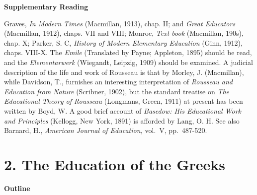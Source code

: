 \documentclass[]{book}
\begin{document}
\textbf{Supplementary Reading}

Graves, \emph{In Modern Times} (Macmillan, 1913), chap. II; and \emph{Great Educators} (Macmillan, 1912), chaps. VII and VIII; Monroe, \emph{Text-book} (Macmillan, 190s), chap. X; Parker, S. C, \emph{History of Modern Elementary Education} (Ginn, 1912), chaps. VIII-X. The \emph{Emile} (Translated by Payne; Appleton, 1895) should be read, and the \emph{Elementarwerk} (Wiegandt, Leipzig, 1909) should be examined. A judicial description of the life and work of Rousseau is that by Morley, J. (Macmillan), while Davidson, T., furnishes an interesting interpretation of \emph{Rousseau and Education from Nature} (Scribner, 1902), but the standard treatise on \emph{The Educational Theory of Rousseau} (Longmans, Green, 1911) at present has been written by Boyd, W. A good brief account of \emph{Basedow: His Educational Work and Principles} (Kellogg, New York, 1891) is afforded by Lang, O. H. See also Barnard, H., \emph{American Journal of Education,} vol.~V, pp.~487-520.

\hypertarget{the-education-of-the-greeks}{%
\chapter{2. The Education of the Greeks}\label{the-education-of-the-greeks}}

\textbf{Outline}
\end{document}
